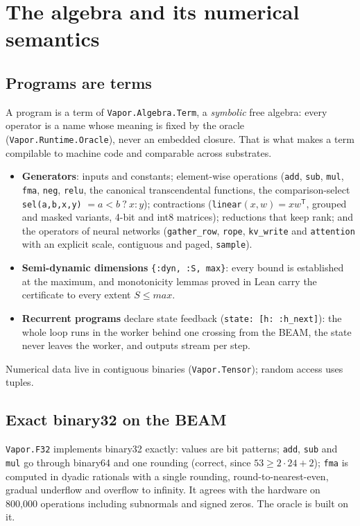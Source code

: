 \chapter{The algebra and its numerical semantics}\label{ch:semantics}

\section{Programs are terms}

A program is a term of \texttt{Vapor.Algebra.Term}, a \emph{symbolic} free algebra: every operator is a
name whose meaning is fixed by the oracle (\texttt{Vapor.Runtime.Oracle}), never an embedded closure.
That is what makes a term compilable to machine code and comparable across substrates.

\begin{itemize}
\item \textbf{Generators}: inputs and constants; element-wise operations (\texttt{add}, \texttt{sub},
  \texttt{mul}, \texttt{fma}, \texttt{neg}, \texttt{relu}, the canonical transcendental functions, the
  comparison-select \texttt{sel(a,b,x,y)} $= a<b\ ?\ x : y$); contractions (\texttt{linear}$(x,w) =
  xw^{\mathsf T}$, grouped and masked variants, 4-bit and int8 matrices); reductions that keep rank; and
  the operators of neural networks (\texttt{gather\_row}, \texttt{rope}, \texttt{kv\_write} and
  \texttt{attention} with an explicit scale, contiguous and paged, \texttt{sample}).
\item \textbf{Semi-dynamic dimensions} \texttt{\{:dyn, :S, max\}}: every bound is established at the
  maximum, and monotonicity lemmas proved in Lean carry the certificate to every extent $S \le
  \textit{max}$.
\item \textbf{Recurrent programs} declare state feedback (\texttt{state: [h: :h\_next]}): the whole
  loop runs in the worker behind one crossing from the BEAM, the state never leaves the worker, and
  outputs stream per step.
\end{itemize}

Numerical data live in contiguous binaries (\texttt{Vapor.Tensor}); random access uses tuples.

\section{Exact binary32 on the BEAM}

\texttt{Vapor.F32} implements binary32 exactly: values are bit patterns; \texttt{add}, \texttt{sub} and
\texttt{mul} go through binary64 and one rounding (correct, since $53 \ge 2\cdot 24 + 2$); \texttt{fma}
is computed in dyadic rationals with a single rounding, round-to-nearest-even, gradual underflow and
overflow to infinity. It agrees with the hardware on 800{,}000 operations including subnormals and
signed zeros. The oracle is built on it.

